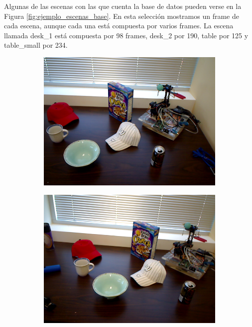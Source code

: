 Algunas de las escenas con las que cuenta la base de datos pueden verse en la Figura \ref{fig:ejemplo_escenas_base}. En esta selección mostramos un frame de cada escena, aunque cada una está compuesta por varios frames. La escena llamada desk\_1 está compuesta por 98 frames, desk\_2 por 190, table por 125 y table\_small por 234.


\begin{figure}
    \centering
    \begin{subfigure}[b]{0.3\textwidth}
        \includegraphics[width=\textwidth]{img/escena_rgbd/table_1_27.png}
    \end{subfigure}
    \quad
    \begin{subfigure}[b]{0.3\textwidth}
        \includegraphics[width=\textwidth]{img/escena_rgbd/table_1_34.png}

\end{subfigure}
\end{figure}
